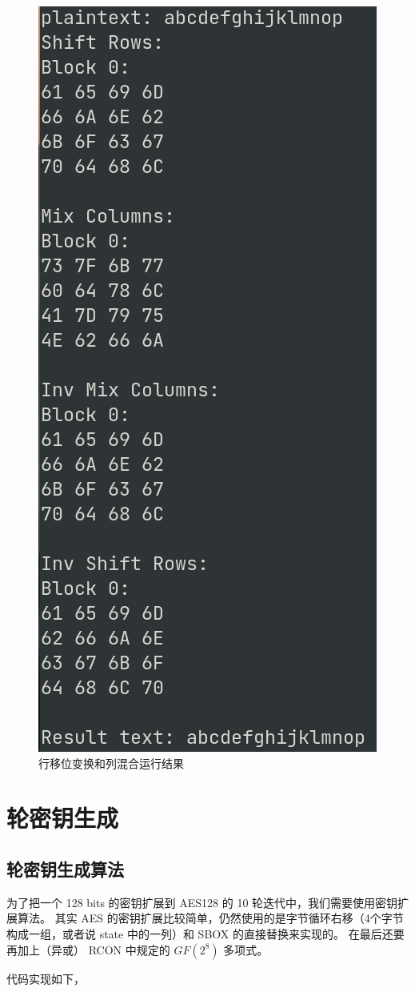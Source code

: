 \documentclass[degree=project,degree-type=project,cjk-font=noto]{thuthesis}
\begin{document}
\begin{figure}[h]
\centering%
\includegraphics[width=.3\linewidth]{aes_t2.png}
  \caption{行移位变换和列混合运行结果}
  \label{fig:t2}
\end{figure}

\section{轮密钥生成}

\subsection{轮密钥生成算法}

为了把一个 128 bits 的密钥扩展到 AES128 的 10 轮迭代中，我们需要使用密钥扩展算法。
其实 AES 的密钥扩展比较简单，仍然使用的是字节循环右移（4个字节构成一组，或者说 state 中的一列）和 SBOX 的直接替换来实现的。
在最后还要再加上（异或） RCON 中规定的 $GF(2^8)$ 多项式。

代码实现如下，
\end{document}
